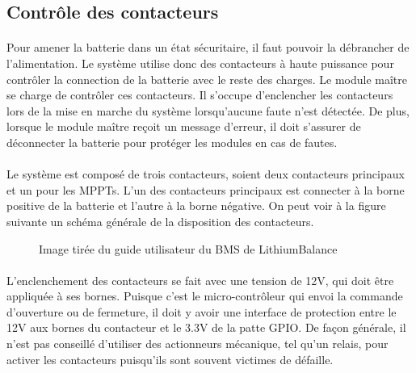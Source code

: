
\subsection{Contrôle des contacteurs}

	\paragraph*{}
	Pour amener la batterie dans un état sécuritaire, il faut pouvoir la débrancher de l'alimentation. Le système utilise donc des contacteurs à haute puissance pour contrôler la connection de la batterie avec le reste des charges. Le module maître se charge de contrôler ces contacteurs. Il s'occupe d'enclencher les contacteurs lors de la mise en marche du système lorsqu'aucune faute n'est détectée. De plus, lorsque le module maître reçoit un message d'erreur, il doit s'assurer de déconnecter la batterie pour protéger les modules en cas de fautes.

	\paragraph*{}
	Le système est composé de trois contacteurs, soient deux contacteurs principaux et un pour les MPPTs. L'un des contacteurs principaux est connecter à la borne positive de la batterie et l'autre à la borne négative. On peut voir à la figure suivante un schéma générale de la disposition des contacteurs. 
	
	\begin{figure}[H]
		\centering
		\caption[Diagramme général des contacteurs]{Image tirée du guide utilisateur du BMS de LithiumBalance \cite{Lithium_Balance}}
		\label{fig:lithiumbalancecontactordiagram}
	\end{figure}

	\paragraph*{}
	L'enclenchement des contacteurs se fait avec une tension de 12V, qui doit être appliquée à ses bornes. Puisque c'est le micro-contrôleur qui envoi la commande d'ouverture ou de fermeture, il doit y avoir une interface de protection entre le 12V aux bornes du contacteur et le 3.3V de la patte GPIO. De façon générale, il n'est pas conseillé d'utiliser des actionneurs mécanique, tel qu'un relais, pour activer les contacteurs puisqu'ils sont souvent victimes de défaille. 	 

